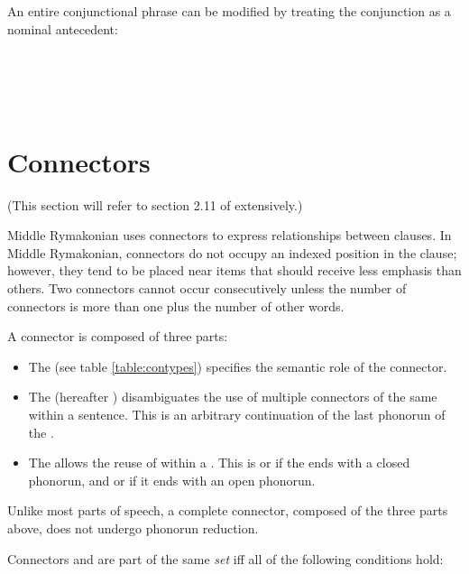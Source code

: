 \documentclass{book}
\newcommand{\lname}{Middle Rymakonian}
\begin{document}
An entire conjunctional phrase can be modified by treating the conjunction as a nominal antecedent: \\
~\\
 \\
 \\
   \\
   

\section{Connectors}

(This section will refer to section 2.11 of  extensively.)

\lname{} uses connectors to express relationships between clauses. In \lname{}, connectors do not occupy an indexed position in the clause; however, they tend to be placed near items that should receive less emphasis than others. Two connectors cannot occur consecutively unless the number of connectors is more than one plus the number of other words.

A connector is composed of three parts:

\begin{itemize}
  \item The  (see table \ref{table:contypes}) specifies the semantic role of the connector.
  \item The  (hereafter ) disambiguates the use of multiple connectors of the same  within a sentence. This is an arbitrary continuation of the last phonorun of the .
  \item The  allows the reuse of  within a . This is  or  if the  ends with a closed phonorun, and  or  if it ends with an open phonorun.
\end{itemize}

Unlike most parts of speech, a complete connector, composed of the three parts above, does not undergo phonorun reduction.

Connectors  and  are part of the same \emph{set}  iff all of the following conditions hold:
\end{document}
